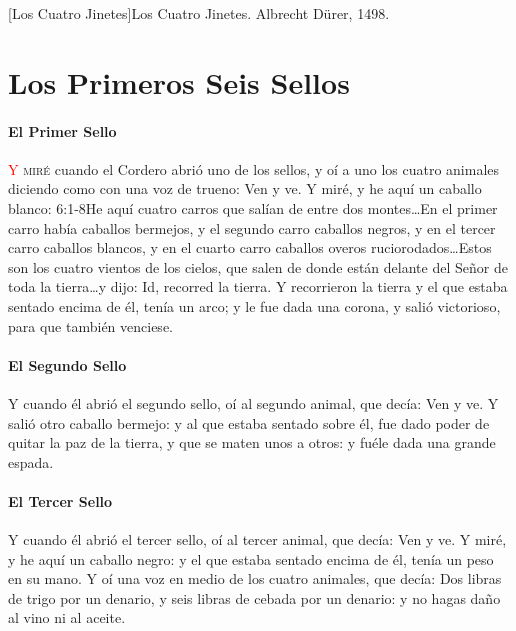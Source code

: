 [Los Cuatro Jinetes]{Los Cuatro Jinetes. Albrecht Dürer, 1498.}

\chapter{Los Primeros Seis Sellos}
\subsubsection*{El Primer Sello}
\lettrine[lines=3,slope=-0.5em,loversize=0.1]{\textcolor{red}{Y}}{\hspace{0.5em} miré} cuando el Cordero abrió uno de los sellos, y oí a uno los cuatro animales diciendo como con una voz de trueno: Ven y ve. 
Y miré, y he aquí un caballo blanco:%
					{6:1-8}{He aquí cuatro carros que salían de entre dos montes\ldots En el primer carro había caballos bermejos, y el segundo carro caballos negros, y en el tercer carro caballos blancos, y en el cuarto carro caballos overos ruciorodados\ldots Estos son los cuatro vientos de los cielos, que salen de donde están delante del Señor de toda la tierra\ldots y dijo: Id, recorred la tierra. Y recorrieron la tierra}
 y el que estaba sentado encima de él, tenía un arco; y le fue dada una corona, y salió victorioso, para que también venciese.
\subsubsection*{El Segundo Sello}
Y cuando él abrió el segundo sello, oí al segundo animal, que decía: Ven y ve. %
Y salió otro caballo bermejo: y al que estaba sentado sobre él, fue dado poder de quitar la paz de la tierra, y que se maten unos a otros: y fuéle dada una grande espada.
\subsubsection*{El Tercer Sello}
Y cuando él abrió el tercer sello, oí al tercer animal, que decía: Ven y ve. Y miré, y he aquí un caballo negro: y el que estaba sentado encima de él, tenía un peso en su mano. %
Y oí una voz en medio de los cuatro animales, que decía: Dos libras de trigo por un denario, y seis libras de cebada por un denario: y no hagas daño al vino ni al aceite.
